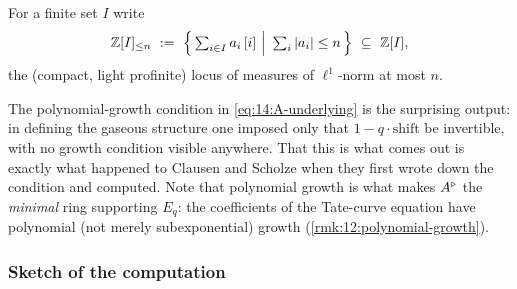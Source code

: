 \begin{notation}
\label{not:14:bounded}
For a finite set $I$ write
\begin{equation*}
\mathbb{Z}[I]_{\le n}\ :=\ \Bigl\{\,\textstyle\sum_{i\in I} a_i\,[i]\ \Big|\ \sum_i|a_i|\le n\,\Bigr\}\ \subseteq\ \mathbb{Z}[I],
\end{equation*}
the (compact, light profinite) locus of measures of $\ell^1$-norm at most $n$.
\end{notation}

\begin{remark}
\label{rmk:14:surprise}
The polynomial-growth condition in \eqref{eq:14:A-underlying} is the surprising
output: in defining the gaseous structure one imposed only that $1-q\cdot\mathrm{shift}$
be invertible, with no growth condition visible anywhere. That this is what comes
out is exactly what happened to Clausen and Scholze when they first wrote down the
condition and computed. Note that polynomial growth is what makes $A^{\triangleright}$ the
\emph{minimal} ring supporting $E_q$: the coefficients of the Tate-curve equation
have polynomial (not merely subexponential) growth (\cref{rmk:12:polynomial-growth}).
\end{remark}

\subsubsection*{Sketch of the computation}

